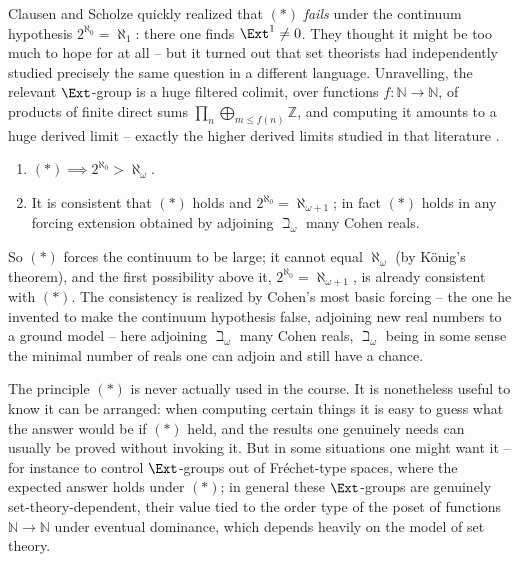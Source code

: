 \begin{remark}
\label{rmk:4:star-CH}
Clausen and Scholze quickly realized that $(\ast)$ \emph{fails} under the
continuum hypothesis $2^{\aleph_0}=\aleph_1$: there one finds
$\Ext^{1}\neq0$. They thought it might be too much to hope for at all -- but it
turned out that set theorists had independently studied precisely the same
question in a different language. Unravelling, the relevant $\Ext$-group is a
huge filtered colimit, over functions $f\colon\mathbb{N}\to\mathbb{N}$, of
products of finite direct sums $\prod_{n}\bigoplus_{m\leq f(n)}\mathbb{Z}$, and
computing it amounts to a huge derived limit -- exactly the higher derived
limits studied in that literature
\cite{bergfalk2021simultaneouslyvanishinghigherderived,bergfalk2021simutaneouslyvanishinghigherderived}.
\end{remark}

\begin{theorem}
\label{thm:4:star-set-theory}
\leavevmode
\begin{enumerate}
\item $(\ast)\implies 2^{\aleph_0}>\aleph_{\omega}$.
\item It is consistent that $(\ast)$ holds and
$2^{\aleph_0}=\aleph_{\omega+1}$; in fact $(\ast)$ holds in any forcing extension
obtained by adjoining $\beth_{\omega}$ many Cohen reals.
\end{enumerate}
\end{theorem}

So $(\ast)$ forces the continuum to be large; it cannot equal $\aleph_{\omega}$
(by K\"onig's theorem), and the first possibility above it,
$2^{\aleph_0}=\aleph_{\omega+1}$, is already consistent with $(\ast)$. The
consistency is realized by Cohen's most basic forcing -- the one he invented to
make the continuum hypothesis false, adjoining new real numbers to a ground model
-- here adjoining $\beth_{\omega}$ many Cohen reals, $\beth_{\omega}$ being in
some sense the minimal number of reals one can adjoin and still have a
chance.

\begin{remark}
\label{rmk:4:star-usage}
The principle $(\ast)$ is never actually used in the course. It is nonetheless
useful to know it can be arranged: when computing certain things it is easy to
guess what the answer would be if $(\ast)$ held, and the results one genuinely
needs can usually be proved without invoking it. But in some situations one might
want it -- for instance to control $\Ext$-groups out of Fr\'echet-type spaces,
where the expected answer holds under $(\ast)$; in general these $\Ext$-groups
are genuinely set-theory-dependent, their value tied to the order type of the
poset of functions $\mathbb{N}\to\mathbb{N}$ under eventual dominance, which
depends heavily on the model of set theory.
\end{remark}
